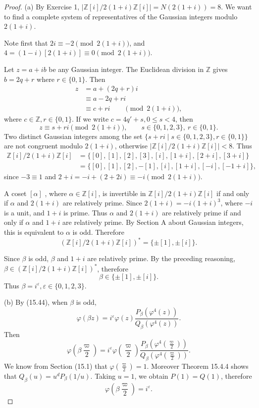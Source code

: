 \documentclass[11pt,a4paper]{article}
\newcommand{\Z}{\mathbb{Z}}
\begin{document}
\begin{proof} 
\item[(a)] By Exercise 1, $|\Z[i]/2(1+i)\Z[i]| = N(2(1+i)) = 8$.
We want to find a complete system of representatives of the Gaussian integers modulo $2(1+i)$. 

Note first that $2i \equiv -2 \pmod{2(1+i)}$, and $4 = (1-i)[2(1+i)] \equiv 0 \pmod{2(1+i)}$. 

Let $z = a+ib$ be any Gaussian integer. The Euclidean division in $\Z$ gives  $b = 2q +r$ where $r \in \{0,1\}$. Then
\begin{align*}
z  &= a+ (2q + r)i\\
&\equiv a- 2q +ri\\
&\equiv c+ri \qquad \pmod {2(1+i)},
\end{align*}
where $c \in \Z, r \in \{0,1\}$. If we write $c = 4q' +s, 0\leq s <4$, then 
$$z \equiv s +ri \pmod{2(1+i)}, \qquad s \in \{0,1,2,3\},\  r\in \{0,1\}.$$
Two distinct  Gaussian integers among the set $\{s +ri \mid s \in \{0,1,2,3\}, r\in \{0,1\}\}$ are not congruent modulo $2(1+i)$, otherwise $|\Z[i]/2(1+i)\Z[i]| < 8$. Thus
\begin{align*}
\Z[i]/2(1+i)\Z[i] &= \{[0], [1],[2],[3], [i],[1+i],[2+i],[3+i]\}\\
&=\{[0],[1],[2],-[1],[i],[1+i],[-i],[-1+i]\},
\end{align*}
since $-3 \equiv 1$ and $2 + i = -i + (2+2i)  \equiv -i \pmod{2(1+i)}$.

A coset $[\alpha]$ , where $\alpha \in \Z[i]$, is invertible in $\Z[i]/2(1+i)\Z[i] $ if and only if $\alpha$ and $2(1+i)$ are relatively prime. Since $2(1+i) = -i(1+i)^3$, where $-i$ is a unit, and $1+i$ is prime. Thus  $\alpha$ and $2(1+i)$ are relatively prime if and only if $\alpha$ and $1+i$ are relatively prime. By Section A about Gaussian integers, this is equivalent to $\alpha$ is odd. Therefore
$$\left(\Z[i]/2(1+i)\Z[i]\right)^* = \{\pm[1],\pm[i]\}.$$

Since $\beta$ is odd, $\beta$ and $1+i$ are relatively prime. By the preceding reasoning, $\beta \in \left(\Z[i]/2(1+i)\Z[i]\right)^*$, therefore
$$\beta \in \{\pm[1],\pm[i]\}.$$
Thus $\beta = i^\varepsilon, \varepsilon \in\{0,1,2,3\}$.

\item[(b)] By (15.44), when $\beta$ is odd,
$$\varphi(\beta z) = i^\varepsilon \varphi(z) \frac{P_\beta\left(\varphi^4(z)\right)}{Q_\beta\left(\varphi^4(z)\right)}.$$
Then 
$$\varphi\left(\beta \frac{\varpi}{2}\right) = i^{\varepsilon} \varphi\left(\frac{\varpi}{2}\right)  \frac{P_\beta\left(\varphi^4(\frac{\varpi}{2})\right)}{Q_\beta\left(\varphi^4(\frac{\varpi}{2})\right)}.$$
We know from Section (15.1) that $\varphi\left(\frac{\varpi}{2}\right) =1$. Moreover Theorem 15.4.4 shows that $Q_\beta(u) = u^dP_\beta(1/u)$. Taking $u=1$, we obtain $P(1) = Q(1)$, therefore
$$\varphi\left(\beta \frac{\varpi}{2}\right) = i^{\varepsilon}.$$
\end{proof}
\end{document}
